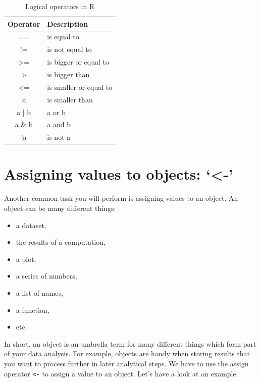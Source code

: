 \documentclass[
  letterpaper,
]{krantz}
\begin{document}
\begingroup
\fontsize{12.0pt}{14.4pt}\selectfont

\begin{longtable}{cl}

\caption{\label{tbl-logical-operators-r}Logical operators in R}

\tabularnewline

\toprule
Operator & Description \\ 
\midrule\addlinespace[2.5pt]
== & is equal to \\ 
!= & is not equal to \\ 
>= & is bigger or equal to \\ 
> & is bigger than \\ 
<= & is smaller or equal to \\ 
< & is smaller than \\ 
a | b & a or b \\ 
a \& b & a and b \\ 
!a & is not a \\ 
\bottomrule

\end{longtable}

\endgroup

\section{Assigning values to objects:
`\textless-'}\label{sec-assigning-values-to-objects}

Another common task you will perform is assigning values to an object.
An object can be many different things:

\begin{itemize}
\item
  a dataset,
\item
  the results of a computation,
\item
  a plot,
\item
  a series of numbers,
\item
  a list of names,
\item
  a function,
\item
  etc.
\end{itemize}

In short, an object is an umbrella term for many different things which
form part of your data analysis. For example, objects are handy when
storing results that you want to process further in later analytical
steps. We have to use the assign operator \texttt{\textless{}-} to
assign a value to an object. Let's have a look at an example.
\end{document}
